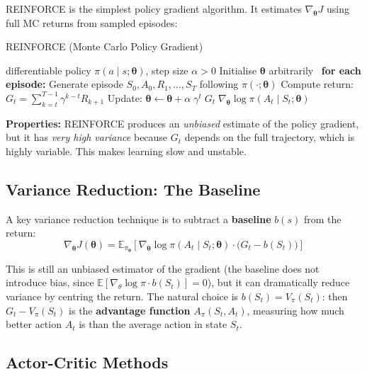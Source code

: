 \documentclass[11pt,a4paper]{article}
\newcommand{\E}{\mathbb{E}}
\newcommand{\term}[1]{\textcolor{DefGreen}{\textbf{#1}}}
\begin{document}
REINFORCE is the simplest policy gradient algorithm. It estimates $\nabla_{\boldsymbol{\theta}}J$ using full MC returns from sampled episodes:

\begin{algobox}[breakable]{REINFORCE (Monte Carlo Policy Gradient)}
\begin{algorithmic}[1]
\Require differentiable policy $\pi(a\mid s;\boldsymbol{\theta})$, step size $\alpha > 0$
\State Initialise $\boldsymbol{\theta}$ arbitrarily
\Loop\ \textbf{for each episode:}
  \State Generate episode $S_0,A_0,R_1,\ldots,S_T$ following $\pi(\cdot;\boldsymbol{\theta})$
    \State Compute return: $G_t = \sum_{k=t}^{T-1}\gamma^{k-t}R_{k+1}$
    \State Update: $\boldsymbol{\theta} \leftarrow \boldsymbol{\theta} + \alpha\;\gamma^t\;G_t\;\nabla_{\boldsymbol{\theta}}\log\pi(A_t\mid S_t;\boldsymbol{\theta})$
  \EndFor
\EndLoop
\end{algorithmic}
\end{algobox}

\textbf{Properties:} REINFORCE produces an \emph{unbiased} estimate of the policy gradient, but it has \emph{very high variance} because $G_t$ depends on the full trajectory, which is highly variable. This makes learning slow and unstable.

\subsection{Variance Reduction: The Baseline}

A key variance reduction technique is to subtract a \term{baseline} $b(s)$ from the return:
\[
\nabla_{\boldsymbol{\theta}} J(\boldsymbol{\theta}) = \E_{\pi_{\boldsymbol{\theta}}}\!\left[\nabla_{\boldsymbol{\theta}}\log\pi(A_t\mid S_t;\boldsymbol{\theta})\cdot\bigl(G_t - b(S_t)\bigr)\right]
\]

This is still an unbiased estimator of the gradient (the baseline does not introduce bias, since $\E[\nabla_\theta\log\pi \cdot b(S_t)] = 0$), but it can dramatically reduce variance by centring the return. The natural choice is $b(S_t) = V_\pi(S_t)$: then $G_t - V_\pi(S_t)$ is the \term{advantage function} $A_\pi(S_t, A_t)$, measuring how much better action $A_t$ is than the average action in state $S_t$.

\subsection{Actor-Critic Methods}
\end{document}
